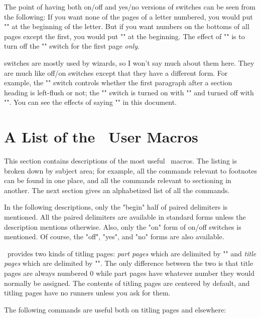 The point of having both on/off and yes/no versions of switches
can be seen from the following: If you want none of the pages of
a letter numbered, you would put "\offfooters" at the beginning of
the letter.  But if you want numbers on the bottoms of all pages
except the first, you would put "\nofooters" at the beginning.
The effect of "\nofooters" is to turn off the "\footers" switch
for the first page {\it only}.

 switches are mostly used by wizards, so I
won't say much about them here.  They are much like off/on
switches except that they have a different form.  For example,
the "\vpar" switch controls whether the first paragraph after a
section heading is left-flush or not; the "\vpar" switch is
turned on with "\vpartrue" and turned off with "\vparfalse".  You
can see the effects of saying "\vpartrue" in this document.

\section {A List of the \ytex\ User Macros}

This section contains descriptions of the most useful \ytex\
macros.  The listing is broken down by subject area; for example,
all the commands relevant to footnotes can be found in one place,
and all the commands relevant to sectioning in another.  The next
section gives an alphabetized list of all the commands.

In the following descriptions, only the "begin" half of paired
delimiters is mentioned.  All the paired delimiters are available
in standard forms unless the description mentions otherwise.
Also, only the "on" form of on/off switches is mentioned.  Of
course, the "off", "yes", and "no" forms are also available.


\ytex\ provides two kinds of titling pages: {\it part pages}
which are delimited by \+"\beginpartpage"\+ and {\it title pages}
which are delimited by \+"\begintitlepage"\+.  The only
difference between the two is that title pages are always
numbered 0 while part pages have whatever number they would
normally be assigned.  The contents of titling pages are centered
by default, and titling pages have no runners unless you ask for
them.

The following commands are useful both on titling pages and
elsewhere:

\begingab

